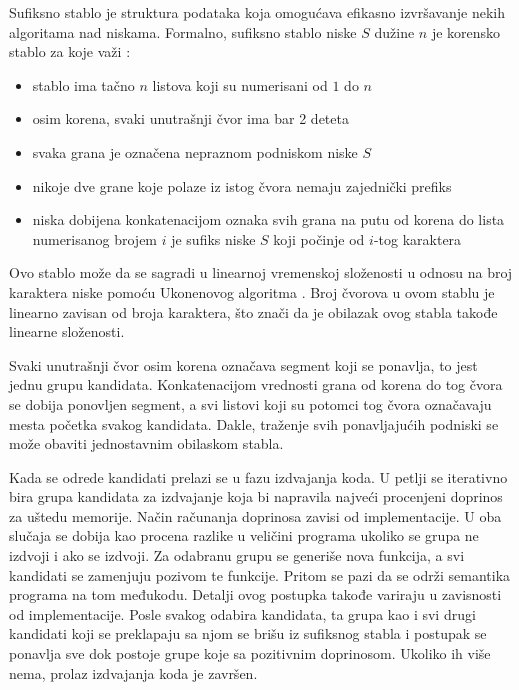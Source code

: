 \documentclass[12pt,oneside]{memoir}
\begin{document}
Sufiksno stablo je struktura podataka koja omogućava efikasno izvršavanje nekih algoritama nad niskama.
Formalno, sufiksno stablo niske $S$ dužine $n$ je korensko stablo za koje važi \cite{zivkovicalgoritmi}: %
\begin{itemize}
  \item stablo ima tačno $n$ listova koji su numerisani od $1$ do $n$
  \item osim korena, svaki unutrašnji čvor ima bar 2 deteta
  \item svaka grana je označena nepraznom podniskom niske $S$
  \item nikoje dve grane koje polaze iz istog čvora nemaju zajednički prefiks
  \item niska dobijena konkatenacijom oznaka svih grana na putu od korena do lista numerisanog brojem $i$ je sufiks niske $S$ koji počinje od $i$-tog karaktera
\end{itemize}
Ovo stablo može da se sagradi u linearnoj vremenskoj složenosti u odnosu na broj karaktera niske pomoću Ukonenovog algoritma \cite{ukkonen1993suffix}.
Broj čvorova u ovom stablu je linearno zavisan od broja karaktera, što znači da je obilazak ovog stabla takođe linearne složenosti.

Svaki unutrašnji čvor osim korena označava segment koji se ponavlja, to jest jednu grupu kandidata.
Konkatenacijom vrednosti grana od korena do tog čvora se dobija ponovljen segment, a svi listovi koji su potomci tog čvora označavaju mesta početka svakog kandidata.
Dakle, traženje svih ponavljajućih podniski se može obaviti jednostavnim obilaskom stabla.


Kada se odrede kandidati prelazi se u fazu izdvajanja koda.
U petlji se iterativno bira grupa kandidata za izdvajanje koja bi napravila najveći procenjeni doprinos za uštedu memorije.
Način računanja doprinosa zavisi od implementacije.
U oba slučaja se dobija kao procena razlike u veličini programa ukoliko se grupa ne izdvoji i ako se izdvoji.
Za odabranu grupu se generiše nova funkcija, a svi kandidati se zamenjuju pozivom te funkcije.
Pritom se pazi da se održi semantika programa na tom međukodu.
Detalji ovog postupka takođe variraju u zavisnosti od implementacije.
Posle svakog odabira kandidata, ta grupa kao i svi drugi kandidati koji se preklapaju sa njom se brišu iz sufiksnog stabla i postupak se ponavlja sve dok postoje grupe koje sa pozitivnim doprinosom.
Ukoliko ih više nema, prolaz izdvajanja koda je završen.
\end{document}
